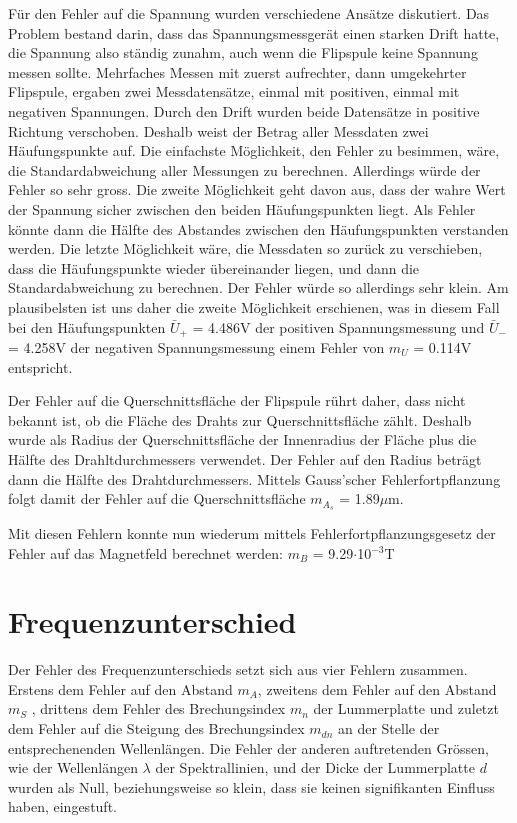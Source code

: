 \documentclass[a4paper,parskip,11pt, DIV12]{scrreprt}
\begin{document}
	Für den Fehler auf die Spannung wurden verschiedene Ansätze diskutiert. Das Problem bestand darin, dass das Spannungsmessgerät einen starken Drift hatte, die Spannung also ständig zunahm, auch wenn die Flipspule keine Spannung messen sollte. Mehrfaches Messen mit zuerst aufrechter, dann umgekehrter Flipspule, ergaben zwei Messdatensätze, einmal mit positiven, einmal mit negativen Spannungen. Durch den Drift wurden beide Datensätze in positive Richtung verschoben. Deshalb weist der Betrag aller Messdaten zwei Häufungspunkte auf. Die einfachste Möglichkeit, den Fehler zu besimmen, wäre, die Standardabweichung aller Messungen zu berechnen. Allerdings würde der Fehler so sehr gross. Die zweite Möglichkeit geht davon aus, dass der wahre Wert der Spannung sicher zwischen den beiden Häufungspunkten liegt. Als Fehler könnte dann die Hälfte des Abstandes zwischen den Häufungspunkten verstanden werden. Die letzte Möglichkeit wäre, die Messdaten so zurück zu verschieben, dass die Häufungspunkte wieder übereinander liegen, und dann die Standardabweichung zu berechnen. Der Fehler würde so allerdings sehr klein. Am plausibelsten ist uns daher die zweite Möglichkeit erschienen, was in diesem Fall bei den Häufungspunkten $\bar{U}_+$ = 4.486V der positiven Spannungsmessung und $\bar{U}_-$ = 4.258V der negativen Spannungsmessung einem Fehler von $m_U$ = 0.114V entspricht.
	
	Der Fehler auf die Querschnittsfläche der Flipspule rührt daher, dass nicht bekannt ist, ob die Fläche des Drahts zur Querschnittsfläche zählt. Deshalb wurde als Radius der Querschnittsfläche der Innenradius der Fläche plus die Hälfte des Drahltdurchmessers verwendet. Der Fehler auf den Radius beträgt dann die Hälfte des Drahtdurchmessers. Mittels Gauss'scher Fehlerfortpflanzung folgt damit der Fehler auf die Querschnittsfläche $m_{A_s}$ = 1.89$\mu$m. 
	
	Mit diesen Fehlern konnte nun wiederum mittels Fehlerfortpflanzungsgesetz der Fehler auf das Magnetfeld berechnet werden: $m_B$ = 9.29$\cdot $10$^{-3}$T
	 
	\section{Frequenzunterschied}
	Der Fehler des Frequenzunterschieds setzt sich aus vier Fehlern zusammen. Erstens dem Fehler auf den Abstand $m_A$, zweitens dem Fehler auf den Abstand $m_S$ , drittens dem Fehler des Brechungsindex $m_n$ der Lummerplatte und zuletzt dem Fehler auf die Steigung des Brechungsindex $m_{dn}$ an der Stelle der entsprechenenden Wellenlängen. Die Fehler der anderen auftretenden Grössen, wie der Wellenlängen $\lambda$ der Spektrallinien, und der Dicke der Lummerplatte $d$  wurden als Null, beziehungsweise so klein, dass sie keinen signifikanten Einfluss haben, eingestuft. 
	
\end{document}
